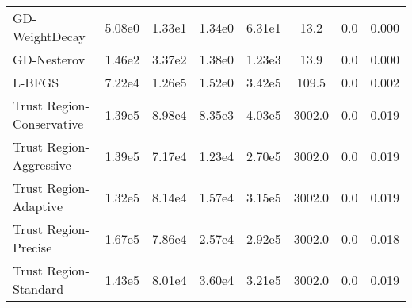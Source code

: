 \documentclass{article}
\begin{document}
\begin{table}[htbp]
{\begin{tabular}{p{2.5cm}*{7}{c}}
GD-WeightDecay & 5.08e0 & 1.33e1 & 1.34e0 & 6.31e1 & 13.2 & 0.0 & 0.000 \\
GD-Nesterov & 1.46e2 & 3.37e2 & 1.38e0 & 1.23e3 & 13.9 & 0.0 & 0.000 \\
L-BFGS & 7.22e4 & 1.26e5 & 1.52e0 & 3.42e5 & 109.5 & 0.0 & 0.002 \\
Trust Region-Conservative & 1.39e5 & 8.98e4 & 8.35e3 & 4.03e5 & 3002.0 & 0.0 & 0.019 \\
Trust Region-Aggressive & 1.39e5 & 7.17e4 & 1.23e4 & 2.70e5 & 3002.0 & 0.0 & 0.019 \\
Trust Region-Adaptive & 1.32e5 & 8.14e4 & 1.57e4 & 3.15e5 & 3002.0 & 0.0 & 0.019 \\
Trust Region-Precise & 1.67e5 & 7.86e4 & 2.57e4 & 2.92e5 & 3002.0 & 0.0 & 0.018 \\
Trust Region-Standard & 1.43e5 & 8.01e4 & 3.60e4 & 3.21e5 & 3002.0 & 0.0 & 0.019 \\
\bottomrule
\end{tabular}
}
\end{table}
\end{document}
